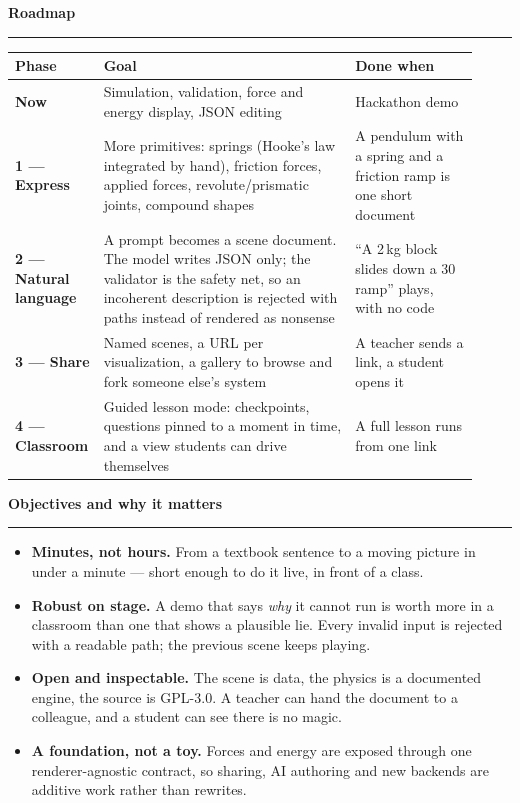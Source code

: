 \documentclass[10pt,a4paper]{article}
\newcommand{\sectionhead}[1]{%
  \vspace{7pt}%
  {\color{accent}\bfseries\large #1}\\[-6pt]
  {\color{accent}\rule{\linewidth}{0.7pt}}\vspace{3pt}%
}
\begin{document}
\sectionhead{Roadmap}

\begin{center}
\small
\begin{tabular}{@{}p{0.13\linewidth}p{0.53\linewidth}p{0.26\linewidth}@{}}
\toprule
\textbf{Phase} & \textbf{Goal} & \textbf{Done when}\\
\midrule
\textbf{Now} & Simulation, validation, force and energy display, JSON editing &
Hackathon demo\\
\textbf{1 --- Express} & More primitives: springs (Hooke's law integrated by hand),
friction forces, applied forces, revolute/prismatic joints, compound shapes &
A pendulum with a spring and a friction ramp is one short document\\
\textbf{2 --- Natural language} & A prompt becomes a scene document. The model writes JSON
only; the validator is the safety net, so an incoherent description is rejected with paths
instead of rendered as nonsense &
``A 2\,kg block slides down a 30\textdegree{} ramp'' plays, with no code\\
\textbf{3 --- Share} & Named scenes, a URL per visualization, a gallery to browse and fork
someone else's system &
A teacher sends a link, a student opens it\\
\textbf{4 --- Classroom} & Guided lesson mode: checkpoints, questions pinned to a moment in
time, and a view students can drive themselves &
A full lesson runs from one link\\
\bottomrule
\end{tabular}
\end{center}

\sectionhead{Objectives and why it matters}

\vspace{-2pt}
{\small
\begin{itemize}
  \item \textbf{Minutes, not hours.} From a textbook sentence to a moving picture in under a
  minute --- short enough to do it live, in front of a class.
  \item \textbf{Robust on stage.} A demo that says \emph{why} it cannot run is worth more in a
  classroom than one that shows a plausible lie. Every invalid input is rejected with a
  readable path; the previous scene keeps playing.
  \item \textbf{Open and inspectable.} The scene is data, the physics is a documented engine,
  the source is GPL-3.0. A teacher can hand the document to a colleague, and a student can see
  there is no magic.
  \item \textbf{A foundation, not a toy.} Forces and energy are exposed through one
  renderer-agnostic contract, so sharing, AI authoring and new backends are additive work
  rather than rewrites.
\end{itemize}}
\end{document}

